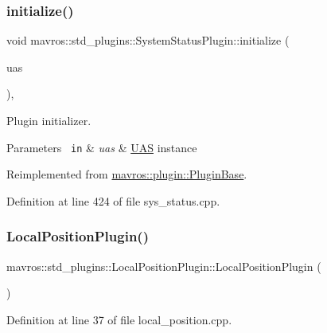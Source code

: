 \subsubsection{\texorpdfstring{initialize()}{initialize()}\hspace{0.1cm}{\footnotesize\ttfamily [41/41]}}
{\footnotesize\ttfamily void mavros\+::std\+\_\+plugins\+::\+System\+Status\+Plugin\+::initialize (\begin{DoxyParamCaption}\item[{\mbox{\hyperlink{classmavros_1_1UAS}{U\+AS}} \&}]{uas }\end{DoxyParamCaption})\hspace{0.3cm}{\ttfamily [inline]}, {\ttfamily [virtual]}}



Plugin initializer. 


\begin{DoxyParams}[1]{Parameters}
\mbox{\texttt{ in}}  & {\em uas} & {\ttfamily \mbox{\hyperlink{classmavros_1_1UAS}{U\+AS}}} instance \\
\hline
\end{DoxyParams}


Reimplemented from \mbox{\hyperlink{group__plugin_gad5313a41da4d26acbbabf008cdc21e82}{mavros\+::plugin\+::\+Plugin\+Base}}.



Definition at line 424 of file sys\+\_\+status.\+cpp.

\mbox{\label{group__plugin_gad2a26e43b5b4e92c9a25e65b42e7fcf9}} 
\subsubsection{\texorpdfstring{LocalPositionPlugin()}{LocalPositionPlugin()}}
{\footnotesize\ttfamily mavros\+::std\+\_\+plugins\+::\+Local\+Position\+Plugin\+::\+Local\+Position\+Plugin (\begin{DoxyParamCaption}{ }\end{DoxyParamCaption})\hspace{0.3cm}{\ttfamily [inline]}}



Definition at line 37 of file local\+\_\+position.\+cpp.

\mbox{\label{group__plugin_gac7d70e0432c00220da41948757a35a50}} 
